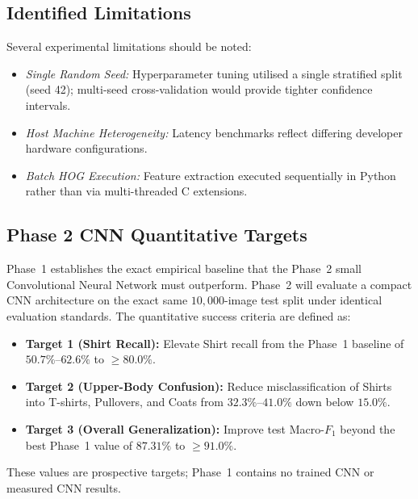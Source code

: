 \documentclass[conference]{IEEEtran}
\begin{document}
\subsection{Identified Limitations}
Several experimental limitations should be noted:
\begin{itemize}
  \item \emph{Single Random Seed:} Hyperparameter tuning utilised a single
    stratified split (seed 42); multi-seed cross-validation would provide
    tighter confidence intervals.
  \item \emph{Host Machine Heterogeneity:} Latency benchmarks reflect
    differing developer hardware configurations.
  \item \emph{Batch HOG Execution:} Feature extraction executed
    sequentially in Python rather than via multi-threaded C extensions.
\end{itemize}

\subsection{Phase 2 CNN Quantitative Targets}
Phase~1 establishes the exact empirical baseline that the Phase~2 small
Convolutional Neural Network must outperform. Phase~2 will evaluate a
compact CNN architecture on the exact same $10{,}000$-image test split
under identical evaluation standards. The quantitative success criteria
are defined as:
\begin{itemize}
  \item \textbf{Target 1 (Shirt Recall):} Elevate Shirt recall from the
    Phase~1 baseline of $50.7\%$--$62.6\%$ to $\mathbf{\ge 80.0\%}$.
  \item \textbf{Target 2 (Upper-Body Confusion):} Reduce misclassification
    of Shirts into T-shirts, Pullovers, and Coats from $32.3\%$--$41.0\%$
    down below $\mathbf{15.0\%}$.
  \item \textbf{Target 3 (Overall Generalization):} Improve test Macro-$F_1$
    beyond the best Phase~1 value of $87.31\%$ to $\mathbf{\ge 91.0\%}$.
\end{itemize}
These values are prospective targets; Phase~1 contains no trained CNN
or measured CNN results.
\end{document}
